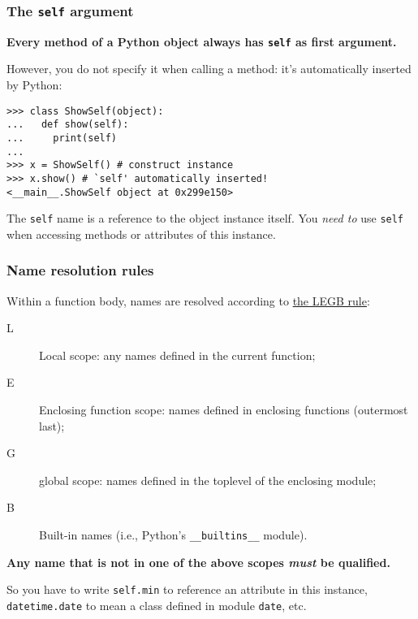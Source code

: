 \documentclass[english,serif,mathserif,xcolor=pdftex,dvipsnames,table]{beamer}
\begin{document}
\begin{frame}[fragile]
  \frametitle{The \texttt{self} argument}

  \textbf{Every method of a Python object always has \texttt{self}
    as first argument.}

  \+
  However, you do not specify it when calling a method: it's
  automatically inserted by Python:
\begin{lstlisting}
>>> class ShowSelf(object):
...   def show(self):
...     print(self)
... 
>>> x = ShowSelf() # construct instance
>>> x.show() # `self' automatically inserted!
<__main__.ShowSelf object at 0x299e150>
\end{lstlisting}

  \+ 
  The \texttt{self} name is a reference to the object instance
  itself.  You \emph{need to} use \texttt{self} when accessing methods
  or attributes of this instance.
\end{frame}


\begin{frame}[fragile]
  \frametitle{Name resolution rules}
  \small

  Within a function body, names are resolved according to \href{http://stackoverflow.com/questions/291978/short-description-of-python-scoping-rules/292502#292502}{the LEGB rule}:
  \begin{description}
  \item[L] Local scope: any names defined in the current function;
  \item[E] Enclosing function scope: names defined in enclosing
    functions (outermost last);
  \item[G] global scope: names defined in the toplevel of the enclosing module;
  \item[B] Built-in names (i.e., Python's \texttt{\_\_builtins\_\_} module).
  \end{description}

  \+
  \textbf{Any name that is not in one of the above scopes \emph{must}
    be qualified.}

  \+
  So you have to write \texttt{self.min} to reference an attribute in
  this instance, \texttt{datetime.date} to mean a class defined in module
  \texttt{date}, etc.

\end{frame}
\end{document}
